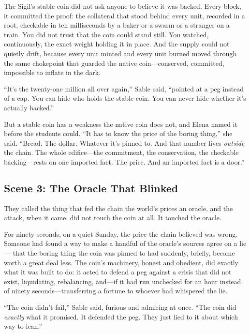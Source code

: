 The Sigil's stable coin did not ask anyone to believe it was backed. Every block,
it committed the proof: the collateral that stood behind every unit, recorded in a
root, checkable in ten milliseconds by a baker or a swarm or a stranger on a train.
You did not trust that the coin could stand still. You watched, continuously, the
exact weight holding it in place. And the supply could not quietly drift, because
every unit minted and every unit burned moved through the same chokepoint that
guarded the native coin---conserved, committed, impossible to inflate in the dark.

``It's the twenty-one million all over again,'' Sable said, ``pointed at a peg
instead of a cap. You can hide who holds the stable coin. You can never hide whether
it's actually backed.''

But a stable coin has a weakness the native coin does not, and Elena named it
before the students could. ``It has to know the price of the boring thing,'' she
said. ``Bread. The dollar. Whatever it's pinned to. And that number lives
\emph{outside} the chain. The whole edifice---the commitment, the conservation, the
checkable backing---rests on one imported fact. The price. And an imported fact is a
door.''

\hypertarget{scene-3-the-oracle-that-blinked}{%
\subsection{Scene 3: The Oracle That
Blinked}\label{scene-3-the-oracle-that-blinked}}

They called the thing that fed the chain the world's prices an oracle, and the
attack, when it came, did not touch the coin at all. It touched the oracle.

For ninety seconds, on a quiet Sunday, the price the chain believed was wrong.
Someone had found a way to make a handful of the oracle's sources agree on a lie---
that the boring thing the coin was pinned to had suddenly, briefly, become worth a
great deal less. The coin's machinery, honest and obedient, did exactly what it was
built to do: it acted to defend a peg against a crisis that did not exist,
liquidating, rebalancing, and---if it had run unchecked for an hour instead of
ninety seconds---transferring a fortune to whoever had whispered the lie.

``The coin didn't fail,'' Sable said, furious and admiring at once. ``The coin did
\emph{exactly} what it promised. It defended the peg. They just lied to it about
which way to lean.''

